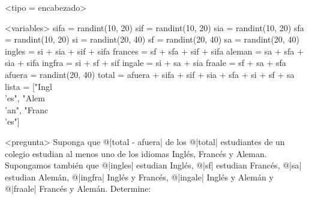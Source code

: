 <tipo = encabezado>

<variables>
sifa = randint(10, 20)
sif = randint(10, 20)
sia = randint(10, 20)
sfa = randint(10, 20)
si = randint(20, 40)
sf = randint(20, 40)
sa = randint(20, 40)
ingles = si + sia + sif + sifa
frances = sf + sfa + sif + sifa
aleman = sa + sfa + sia + sifa
ingfra = si + sf + sif
ingale = si + sa + sia
fraale = sf + sa + sfa
afuera = randint(20, 40)
total = afuera + sifa + sif + sia + sfa + si + sf + sa
lista = ["Ingl\\'es", "Alem\\'an", "Franc\\'es"]

<pregunta>
Suponga que @|total - afuera| de los @|total| estudiantes de un colegio estudian al menos uno de los idiomas Ingl\'es, Franc\'es y Aleman. Supongamos tambi\'en que @|ingles| estudian Ingl\'es, @|sf| estudian Franc\'es, @|sa| estudian Alem\'an, @|ingfra| Ingl\'es y Franc\'es, @|ingale| Ingl\'es y Alem\'an y @|fraale| Franc\'es y Alem\'an. Determine:
